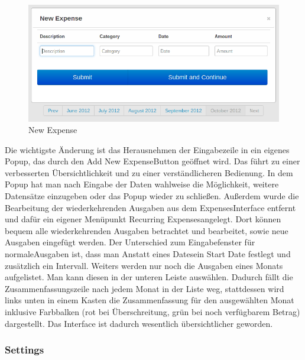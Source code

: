 \documentclass[a4paper,10pt]{article}
\begin{document}
\begin{figure}
\centering
\includegraphics[width=\textwidth]{expenses-new-ip}
\caption{New Expense} \label{fig:expenses-new}
\end{figure}

Die wichtigste \"Anderung ist das Herausnehmen der Eingabezeile in ein eigenes Popup,
das durch den \glqq Add New Expense\grqq\space Button
ge\"offnet wird. Das f\"uhrt zu einer verbesserten \"Ubersichtlichkeit und zu einer verst\"andlicheren Bedienung.
In dem Popup hat man nach Eingabe der Daten wahlweise die M\"oglichkeit, weitere Datens\"atze einzugeben oder das Popup wieder
zu schlie\ss en. Au\ss erdem wurde die Bearbeitung der wiederkehrenden Ausgaben aus dem
\glqq Expenses\grqq\space Interface entfernt und daf\"ur
ein eigener Men\"upunkt \glqq Recurring Expenses\grqq\space angelegt. Dort k\"onnen bequem alle wiederkehrenden Ausgaben betrachtet und
bearbeitet, sowie neue Ausgaben eingef\"ugt werden. Der Unterschied zum
Eingabefenster f\"ur \glqq normale\grqq\space Ausgaben ist,
dass man Anstatt eines \glqq Dates\grqq\space ein \glqq Start Date\grqq\space
festlegt und zus\"atzlich ein Intervall.
Weiters werden nur noch die Ausgaben eines Monats aufgelistet. Man kann diesen in der
unteren Leiste ausw\"ahlen. Dadurch f\"allt
die Zusammenfassungszeile nach jedem Monat in der Liste weg, stattdessen wird links unten in einem Kasten die Zusammenfassung
f\"ur den ausgew\"ahlten Monat inklusive Farbbalken (rot bei \"Uberschreitung, gr\"un bei noch verf\"ugbarem Betrag) dargestellt.
Das Interface ist dadurch wesentlich \"ubersichtlicher geworden.

\clearpage
\subsubsection{Settings}
\end{document}
